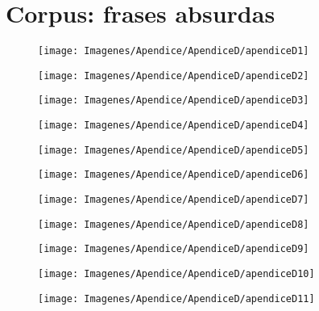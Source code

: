 \chapter{Corpus: frases absurdas}
\label{Appendix:Key2}

\begin{figure}[h]
  \centering
\texttt{[image: Imagenes/Apendice/ApendiceD/apendiceD1]}
\end{figure}

\begin{figure}[h]
  \centering
\texttt{[image: Imagenes/Apendice/ApendiceD/apendiceD2]}
\end{figure}

\begin{figure}[h]
  \centering
\texttt{[image: Imagenes/Apendice/ApendiceD/apendiceD3]}
\end{figure}

\begin{figure}[h]
  \centering
\texttt{[image: Imagenes/Apendice/ApendiceD/apendiceD4]}
\end{figure}

\begin{figure}[h]
  \centering
\texttt{[image: Imagenes/Apendice/ApendiceD/apendiceD5]}
\end{figure}

\begin{figure}[h]
  \centering
\texttt{[image: Imagenes/Apendice/ApendiceD/apendiceD6]}
\end{figure}

\begin{figure}[h]
  \centering
\texttt{[image: Imagenes/Apendice/ApendiceD/apendiceD7]}
\end{figure}

\begin{figure}[h]
  \centering
\texttt{[image: Imagenes/Apendice/ApendiceD/apendiceD8]}
\end{figure}

\begin{figure}[h]
  \centering
\texttt{[image: Imagenes/Apendice/ApendiceD/apendiceD9]}
\end{figure}

\begin{figure}[h]
  \centering
\texttt{[image: Imagenes/Apendice/ApendiceD/apendiceD10]}
\end{figure}

\begin{figure}[h]
  \centering
\texttt{[image: Imagenes/Apendice/ApendiceD/apendiceD11]}
\end{figure}
